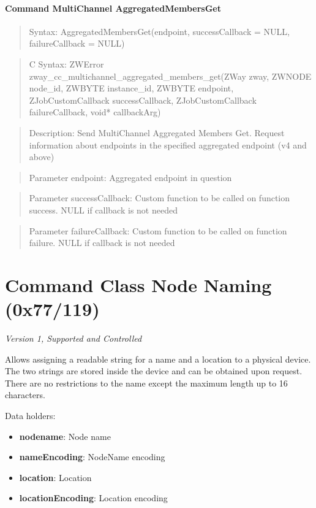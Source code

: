 \paragraph{Command MultiChannel AggregatedMembersGet}
\begin{quote}Syntax: AggregatedMembersGet(endpoint, successCallback = NULL, failureCallback = NULL)\end{quote}
\begin{quote}C Syntax: ZWError zway\_cc\_multichannel\_aggregated\_members\_get(ZWay zway, ZWNODE node\_id, ZWBYTE instance\_id, ZWBYTE endpoint, ZJobCustomCallback successCallback, ZJobCustomCallback failureCallback, void* callbackArg)\end{quote}
\begin{quote}Description: Send MultiChannel Aggregated Members Get. Request information about endpoints in the specified aggregated endpoint (v4 and above)\end{quote}
\begin{quote}Parameter endpoint: Aggregated endpoint in question\end{quote}
\begin{quote}Parameter successCallback: Custom function to be called on function success. NULL if callback is not needed\end{quote}
\begin{quote}Parameter failureCallback: Custom function to be called on function failure. NULL if callback is not needed\end{quote}



\section{Command Class Node Naming (0x77/119)}

\textit{Version 1, Supported and Controlled}
\newline

Allows assigning a readable string for a name and a location to a physical device. The two strings are stored inside the device and can be obtained upon request. There are no restrictions to the name except the maximum length up to 16 characters.
\newline

\noindent
Data holders:

\begin{itemize}
\item \textbf{nodename}: Node name
\item \textbf{nameEncoding}: NodeName encoding
\item \textbf{location}: Location
\item \textbf{locationEncoding}: Location encoding
\end{itemize}

